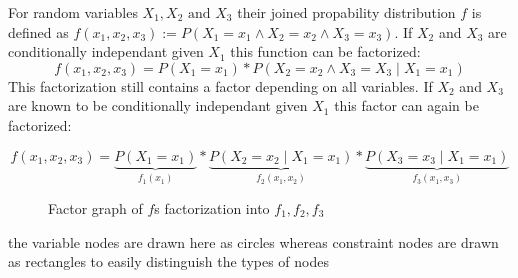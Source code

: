 \begin{example}
For random variables $X_1, X_2 \text{ and } X_3$ their joined propability distribution $f$ is defined as $f(x_1, x_2, x_3) := P(X_1 = x_1 \land X_2  = x_2 \land X_3 = x_3)$. If $X_2$ and $X_3$ are conditionally independant given $X_1$ this function can be factorized: $$f(x_1, x_2, x_3) = P(X_1 = x_1) * P(X_2 = x_2 \land X_3 = X_3 \; | \; X_1 = x_1)$$
This factorization still contains a factor depending on all variables. If $X_2$ and $X_3$ are known to be conditionally independant given $X_1$ this factor can again be factorized:

$$f(x_1, x_2, x_3) = \underbrace{P(X_1 = x_1)}_{f_1(x_1)} * \underbrace{P(X_2 = x_2 \; | \; X_1 = x_1)}_{f_2(x_1, x_2)} * \underbrace{P(X_3 = x_3 \; | \; X_1 = x_1)}_{f_3(x_1, x_3)}$$

\begin{figure}
\centering

\caption{Factor graph of $f$s factorization into $f_1, f_2, f_3$}
\end{figure}

the variable nodes are drawn here as circles whereas constraint nodes are drawn as rectangles to easily distinguish the types of nodes

\end{example}
%

